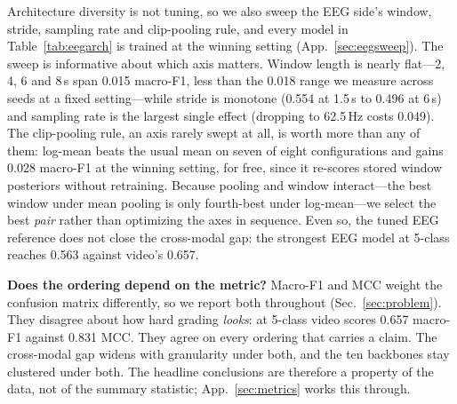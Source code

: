 Architecture diversity is not tuning, so we also sweep the EEG side's window,
stride, sampling rate and clip-pooling rule, and every model in
Table~\ref{tab:eegarch} is trained at the winning setting
(App.~\ref{sec:eegsweep}). The sweep is informative about which axis matters.
Window length is nearly flat---2, 4, 6 and 8\,s span 0.015 macro-F1, less than the
0.018 range we measure across seeds at a fixed setting---while stride is monotone
(0.554 at 1.5\,s to 0.496 at 6\,s) and sampling rate is the largest single effect
(dropping to 62.5\,Hz costs 0.049). The clip-pooling rule, an axis rarely swept at
all, is worth more than any of them: log-mean beats the usual mean on seven of eight
configurations and gains 0.028 macro-F1 at the winning setting, for free, since it
re-scores stored window posteriors without retraining. Because pooling and window
interact---the best window under mean pooling is only fourth-best under
log-mean---we select the best \emph{pair} rather than optimizing the axes in
sequence. Even so, the tuned EEG reference does not close the cross-modal gap: the
strongest EEG model at 5-class reaches 0.563 against video's 0.657.

\noindent\textbf{Does the ordering depend on the metric?}
Macro-F1 and MCC weight the confusion matrix differently, so we report both
throughout (Sec.~\ref{sec:problem}). They disagree about how hard grading \emph{looks}: at 5-class video scores 0.657 macro-F1 against 0.831 MCC. They agree on every ordering that carries a claim. The cross-modal gap widens with granularity under both, and the ten backbones stay clustered under both. The headline conclusions are therefore a property of the data, not of the summary statistic; App.~\ref{sec:metrics} works this through.


